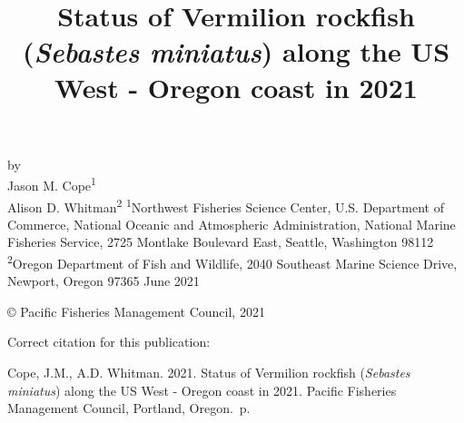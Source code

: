 \documentclass[11pt,
  english,
  a4paper,
]{article}
\date{}
\newcommand{\trTitle}{Status of Vermilion rockfish (\emph{Sebastes miniatus}) along the US West - Oregon coast in 2021}
\newcommand{\trYear}{2021}
\newcommand{\trMonth}{June}
\newcommand{\trAuthsBack}{Cope, J.M., A.D. Whitman}
\newcommand{\trCitation}{
\begin{hangparas}{1em}{1}
\trAuthsBack{}. \trYear{}. \trTitle{}. Pacific Fisheries Management Council, Portland, Oregon. \pageref{LastPage}{}\,p.
\end{hangparas}}
\begin{document}

\renewcommand*{\thefootnote}{\fnsymbol{footnote}}

\small
\thispagestyle{empty}
\noindent
\begin{center}
\title{Status of Vermilion rockfish (\emph{Sebastes miniatus}) along the US West - Oregon coast in 2021}
\vspace{1.5cm}
{\Large\textbf{}}
\vfill
by\\
Jason M. Cope\textsuperscript{1}\\
Alison D. Whitman\textsuperscript{2}\vfill
\textsuperscript{1}Northwest Fisheries Science Center, U.S. Department of Commerce, National Oceanic and Atmospheric Administration, National Marine Fisheries Service, 2725 Montlake Boulevard East, Seattle, Washington 98112\\
\textsuperscript{2}Oregon Department of Fish and Wildlife, 2040 Southeast Marine Science Drive, Newport, Oregon 97365\vfill
\trMonth{} \trYear{}
\end{center}
\clearpage

\thispagestyle{empty}
\vspace*{\fill}
\begin{center}
\copyright{} Pacific Fisheries Management Council, \trYear{}\\
\end{center}
\par
\bigskip
\noindent
Correct citation for this publication:
\bigskip
\par
\trCitation{}
\clearpage


\tableofcontents\clearpage
\label{TRlastRoman}
\clearpage

\newpage
\thispagestyle{empty} %

\pagestyle{plain}  %
\renewcommand*{\thefootnote}{\arabic{footnote}}  %
\setcounter{footnote}{0}  %
\renewcommand{\headrulewidth}{0.5pt}
\renewcommand{\footrulewidth}{0.5pt}
\end{document}
